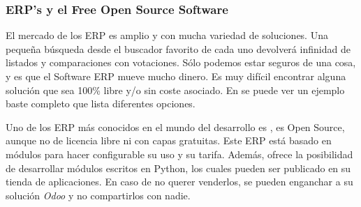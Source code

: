 \subsubsection{ERP's y el Free Open Source Software}
El mercado de los ERP es amplio y con mucha variedad de soluciones. Una pequeña búsqueda desde el buscador favorito de cada uno devolverá infinidad de listados y comparaciones con votaciones. Sólo podemos estar seguros de una cosa, y es que el Software ERP mueve mucho dinero. Es muy difícil encontrar alguna solución que sea 100\% libre y/o sin coste asociado. En \citep{15FreeERP} se puede ver un ejemplo baste completo que lista diferentes opciones.
\par Uno de los ERP más conocidos en el mundo del desarrollo es \citep{odooWebpage}, es Open Source, aunque no de licencia libre ni con capas gratuitas. Este ERP está basado en módulos para hacer configurable su uso y su tarifa. Además, ofrece la posibilidad de desarrollar módulos escritos en Python, los cuales pueden ser publicado en su tienda de aplicaciones.
En caso de no querer venderlos, se pueden enganchar a su solución \emph{Odoo} y no compartirlos con nadie.

